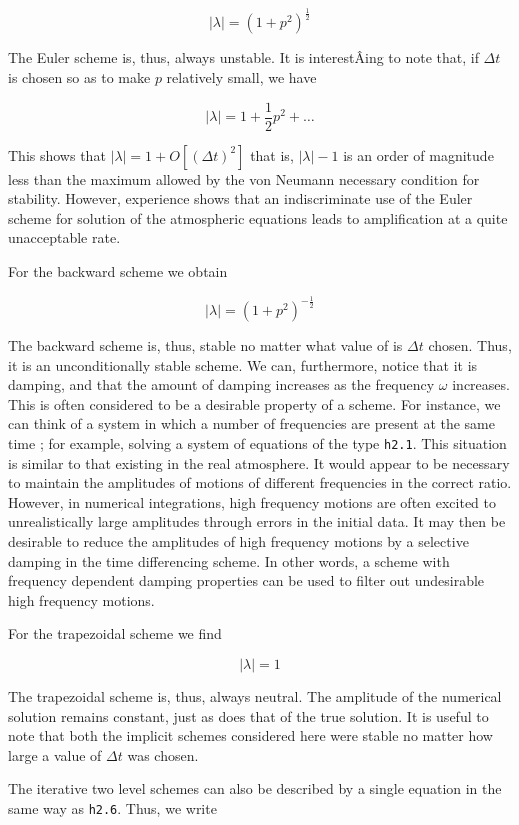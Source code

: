 {\[| \lambda | = \left( 1 + p^{2} \right)^{\frac{1}{2}}\]}

The Euler scheme is, thus, always unstable. It is interestÂ­ing to note
that, if \(\Delta t\) is chosen so as to make \(p\) relatively small, we
have

{\[| \lambda | = 1 + \frac{1}{2}p^{2} + \ldots\]}

This shows that
\(| \lambda | = 1 + O\left\lbrack \left( \Delta t \right)^{2} \right\rbrack\)
that is, \(| \lambda | - 1\) is an order of magnitude less than the
maximum allowed by the von Neumann necessary condition for stability.
However, experience shows that an indiscriminate use of the Euler scheme
for solution of the atmospheric equations leads to amplification at a
quite unacceptable rate.

For the backward scheme we obtain

{\[| \lambda |  = \left( 1 + p^{2} \right)^{-\frac{ 1}{2}}\]}

The backward scheme is, thus, stable no matter what value of is
\(\Delta t\) chosen. Thus, it is an unconditionally stable scheme. We
can, furthermore, notice that it is damping, and that the amount of
damping increases as the frequency \(\omega\) increases. This is often
considered to be a desirable property of a scheme. For instance, we can
think of a system in which a number of frequencies are present at the
same time ; for example, solving a system of equations of the type
\texttt{h2.1}. This situation is similar to that existing in the real
atmosphere. It would appear to be necessary to maintain the amplitudes
of motions of different frequencies in the correct ratio. However, in
numerical integrations, high frequency motions are often excited to
unrealistically large amplitudes through errors in the initial data. It
may then be desirable to reduce the amplitudes of high frequency motions
by a selective damping in the time differencing scheme. In other words,
a scheme with frequency dependent damping properties can be used to
filter out undesirable high frequency motions.

For the trapezoidal scheme we find

{\[| \lambda | = 1\]}

The trapezoidal scheme is, thus, always neutral. The amplitude of the
numerical solution remains constant, just as does that of the true
solution. It is useful to note that both the implicit schemes considered
here were stable no matter how large a value of \(\Delta t\) was chosen.

The iterative two level schemes can also be described by a single
equation in the same way as \texttt{h2.6}. Thus, we write

